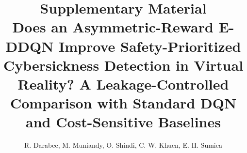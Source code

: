 \documentclass[10pt,a4paper]{article}
\title{Supplementary Material\\[2mm]\large Does an Asymmetric-Reward E-DDQN Improve Safety-Prioritized Cybersickness Detection in Virtual Reality? A Leakage-Controlled Comparison with Standard DQN and Cost-Sensitive Baselines}
\author{R. Darabee, M. Muniandy, O. Shindi, C. W. Khuen, E. H. Sumiea}
\date{}
\begin{document}
\sloppy
\maketitle
\tableofcontents









\end{document}
